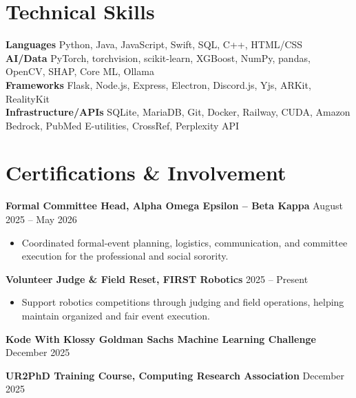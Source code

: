 \documentclass[letterpaper,10pt]{article}
\newcommand{\activityentry}[2]{
  \noindent\textbf{#1} \hfill #2
}
\begin{document}
\section{Technical Skills}

\noindent\textbf{Languages} \quad Python, Java, JavaScript, Swift, SQL, C++, HTML/CSS \\[1pt]
\noindent\textbf{AI/Data} \quad PyTorch, torchvision, scikit-learn, XGBoost, NumPy, pandas, OpenCV, SHAP, Core ML, Ollama \\[1pt]
\noindent\textbf{Frameworks} \quad Flask, Node.js, Express, Electron, Discord.js, Yjs, ARKit, RealityKit \\[1pt]
\noindent\textbf{Infrastructure/APIs} \quad SQLite, MariaDB, Git, Docker, Railway, CUDA, Amazon Bedrock, PubMed E-utilities, CrossRef, Perplexity API


\section{Certifications \& Involvement}

\activityentry
  {Formal Committee Head, Alpha Omega Epsilon -- Beta Kappa}{August 2025 -- May 2026}
\begin{itemize}
  \item Coordinated formal-event planning, logistics, communication, and committee execution for the professional and social sorority.
\end{itemize}

\smallskip

\activityentry
  {Volunteer Judge \& Field Reset, FIRST Robotics}{2025 -- Present}
\begin{itemize}
  \item Support robotics competitions through judging and field operations, helping maintain organized and fair event execution.
\end{itemize}

\smallskip

\activityentry
  {Kode With Klossy \texttimes{} Goldman Sachs Machine Learning Challenge}{December 2025}

\smallskip

\activityentry
  {UR2PhD Training Course, Computing Research Association}{December 2025}

\smallskip
\end{document}
